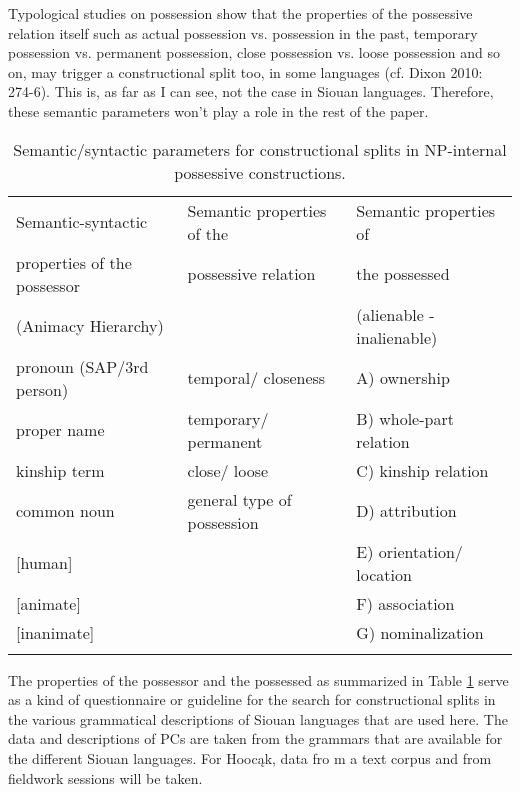 \documentclass[output=paper]{LSP/langsci}
\begin{document}
Typological studies on possession show that the properties of the possessive relation itself such as actual possession vs. possession in the past, temporary possession vs. permanent possession, close possession vs. loose possession and so on, may trigger a constructional split too, in some languages (cf. Dixon 2010: 274-6). This is, as far as I can see, not the case in Siouan languages. Therefore, these semantic parameters won't play a role in the rest of the paper. 

\begin{table}
\caption{Semantic/syntactic parameters for constructional splits in NP-internal possessive constructions.} \label{parameters}
\small
\begin{tabular}[h]{ l l l }

\lsptoprule
Semantic-syntactic &	Semantic properties of the & Semantic properties of \\
properties of the possessor & possessive relation &  the possessed \\

(Animacy Hierarchy) & & (alienable - inalienable) \\
\midrule
pronoun (SAP/3rd person) & temporal/ closeness & A) ownership \\
 
proper name & temporary/ permanent & B) whole-part relation \\
 
kinship term & close/ loose & C) kinship relation \\
 
common noun & general type of possession & D) attribution \\
 
{[human]} & & E) orientation/ location \\
 
{[animate]} & & F) association \\
 
{[inanimate]} & & G) nominalization \\
\lspbottomrule
\end{tabular}
\end{table}

The properties of the possessor and the possessed as summarized in Table \ref{parameters} serve as a kind of questionnaire or guideline for the search for constructional splits in the various grammatical descriptions of Siouan languages that are used here. The data and descriptions of PCs are taken from the grammars that are available for the different Siouan languages. For Hoocąk, data fro m a text corpus and from fieldwork sessions will be taken. 
\end{document}
